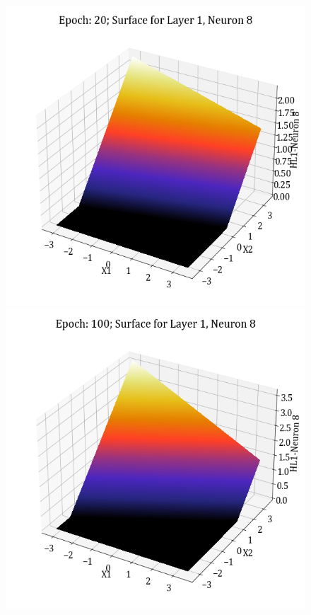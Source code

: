 \documentclass[11pt,a4paper]{article}
\begin{document}
\begin{figure}[H]
    \includegraphics[scale=0.4]{images/1B_MLFFNN_E20_HL1_N8.png}
    \includegraphics[scale=0.4]{images/1B_MLFFNN_E100_HL1_N8.png}

\end{figure}
\end{document}
